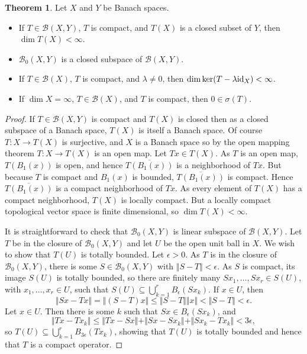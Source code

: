 \documentclass{article}
\newcommand{\id}{\ensuremath\mathrm{id}}
\newcommand{\norm}[1]{\Vert #1 \Vert}
\theoremstyle{definition}
\newtheorem{theorem}{Theorem}
\begin{document}
\begin{theorem}
Let $X$ and $Y$ be Banach spaces.
\begin{itemize}
\item If $T \in \mathscr{B}(X,Y)$, $T$ is compact, and $T(X)$ is a closed subset of $Y$, then $\dim T(X)<\infty$.
\item $\mathscr{B}_0(X,Y)$ is a closed subspace of $\mathscr{B}(X,Y)$.
\item If $T \in \mathscr{B}(X)$, $T$ is compact, and $\lambda \neq 0$, then $\dim \ker(T-\lambda \id_X) < \infty$.
\item If $\dim X=\infty$, $T \in \mathscr{B}(X)$, and $T$ is compact, then $0 \in \sigma(T)$.
\end{itemize}
\label{bigtheorem}
\end{theorem}
\begin{proof}
If $T \in \mathscr{B}(X,Y)$ is compact and $T(X)$ is closed then as a closed subspace of a Banach space, $T(X)$ is itself a Banach space. 
Of course $T:X \to T(X)$ is surjective, and $X$ is a Banach space so by the open mapping theorem $T:X \to T(X)$ is an open map.
Let $Tx \in T(X)$. As $T$ is an open map, $T(B_1(x))$ is open, and hence $\overline{T(B_1(x))}$ is a  neighborhood
of $Tx$. But because $T$ is compact and $B_1(x)$ is bounded, $\overline{T(B_1(x))}$ is compact. Hence $\overline{T(B_1(x))}$ is a compact
neighborhood of $Tx$. As every element of $T(X)$ has a compact neighborhood, $T(X)$ is locally compact.
But a locally compact topological vector space is finite dimensional, so $\dim T(X) < \infty$.


It is straightforward to check that $\mathscr{B}_0(X,Y)$ is linear subspace of $\mathscr{B}(X,Y)$. 
Let $T$ be in the closure of $\mathscr{B}_0(X,Y)$ and let $U$ be the open unit ball in $X$. We wish to show that $T(U)$ is totally bounded.
Let $\epsilon>0$. As $T$ is in the closure of $\mathscr{B}_0(X,Y)$, there is some $S \in \mathscr{B}_0(X,Y)$ with $\norm{S-T} < \epsilon$. As $S$ is compact, its image
$S(U)$ is totally bounded, so there are finitely many $Sx_1,\ldots,Sx_r \in S(U)$, with $x_1,\ldots,x_r \in U$, such that $S(U) \subseteq \bigcup_{k=1}^r B_\epsilon(Sx_k)$.
If $x \in U$, then
\[
\norm{Sx-Tx}=\norm{(S-T)x} \leq \norm{S-T} \norm{x} < \norm{S-T}<\epsilon.
\]
Let $x \in U$. Then there is some $k$ such that $Sx \in B_\epsilon(Sx_k)$, and
\[
\norm{Tx-Tx_k} \leq \norm{Tx-Sx} + \norm{Sx-Sx_k}+\norm{Sx_k-Tx_k}<3\epsilon,
\]
so $T(U) \subseteq \bigcup_{k=1}^r B_{3\epsilon}(Tx_k)$, showing that $T(U)$ is totally bounded and hence that $T$ is a compact operator.


\end{proof}
\end{document}
